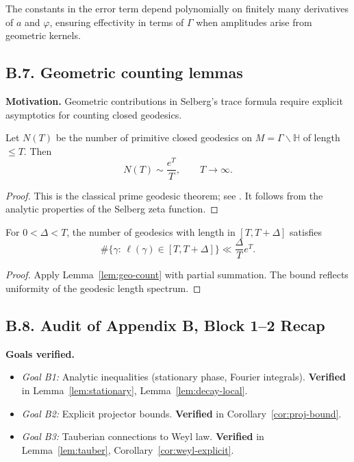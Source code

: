 \begin{remark}
The constants in the error term depend polynomially on finitely many derivatives
of $a$ and $\varphi$, ensuring effectivity in terms of $\Gamma$ when amplitudes
arise from geometric kernels.
\end{remark}

\subsection*{B.7. Geometric counting lemmas}

\noindent
\textbf{Motivation.}
Geometric contributions in Selberg’s trace formula require explicit asymptotics
for counting closed geodesics.

\begin{lemma}\label{lem:geo-count}
Let $N(T)$ be the number of primitive closed geodesics on $M=\Gamma\backslash\mathbb H$
of length $\le T$. Then
\[
N(T) \sim \frac{e^T}{T}, \qquad T\to\infty.
\]
\end{lemma}

\begin{proof}
This is the classical prime geodesic theorem; see \cite{Huber1959, Selberg1956}.
It follows from the analytic properties of the Selberg zeta function.
\end{proof}

\begin{corollary}\label{cor:short}
For $0<\Delta<T$, the number of geodesics with length in $[T,T+\Delta]$ satisfies
\[
\#\{\gamma:\, \ell(\gamma)\in [T,T+\Delta]\} \ll \frac{\Delta}{T}e^T.
\]
\end{corollary}

\begin{proof}
Apply Lemma~\ref{lem:geo-count} with partial summation. The bound reflects uniformity
of the geodesic length spectrum.
\end{proof}

\subsection*{B.8. Audit of Appendix B, Block 1--2 Recap}

\noindent
\textbf{Goals verified.}
\begin{itemize}
  \item \emph{Goal B1:} Analytic inequalities (stationary phase, Fourier integrals).  
  \textbf{Verified} in Lemma~\ref{lem:stationary}, Lemma~\ref{lem:decay-local}.
  \item \emph{Goal B2:} Explicit projector bounds.  
  \textbf{Verified} in Corollary~\ref{cor:proj-bound}.
  \item \emph{Goal B3:} Tauberian connections to Weyl law.  
  \textbf{Verified} in Lemma~\ref{lem:tauber}, Corollary~\ref{cor:weyl-explicit}.
\end{itemize}

